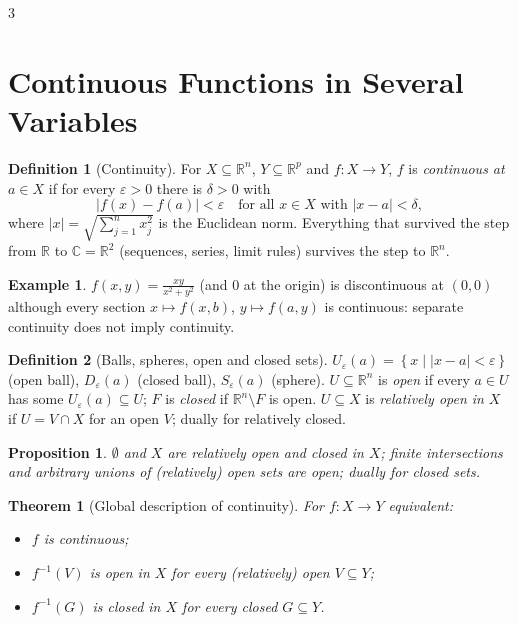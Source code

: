 \documentclass[10pt,a4paper,landscape]{article}
\theoremstyle{definition}
\newtheorem{defn}{Definition}[section]
\newtheorem{exm}{Example}[section]
\theoremstyle{plain}
\newtheorem{thm}{Theorem}[section]
\newtheorem{prop}{Proposition}[section]
\theoremstyle{remark}
\newcommand{\R}{\mathbb{R}}
\newcommand{\C}{\mathbb{C}}
\newcommand{\eps}{\varepsilon}
\newcommand{\abs}[1]{\lvert #1 \rvert}
\newcommand{\set}[1]{\left\{ #1 \right\}}
\begin{document}
\begin{multicols*}{3}

\section{Continuous Functions in Several Variables}

\begin{defn}[Continuity]
For $X \subseteq \R^n$, $Y \subseteq \R^p$ and $f: X \to Y$, $f$ is \emph{continuous at} $a \in X$ if for every $\eps > 0$ there is $\delta > 0$ with
\[
\abs{f(x) - f(a)} < \eps \quad \text{for all } x \in X \text{ with } \abs{x - a} < \delta,
\]
where $\abs{x} = \sqrt{\sum_{j=1}^n x_j^2}$ is the Euclidean norm. Everything that survived the step from $\R$ to $\C = \R^2$ (sequences, series, limit rules) survives the step to $\R^n$.
\end{defn}

\begin{exm}
$f(x,y) = \frac{xy}{x^2+y^2}$ (and $0$ at the origin) is discontinuous at $(0,0)$ although every section $x \mapsto f(x,b)$, $y \mapsto f(a,y)$ is continuous: separate continuity does not imply continuity.
\end{exm}

\begin{defn}[Balls, spheres, open and closed sets]
$U_\eps(a) = \set{x \mid \abs{x-a} < \eps}$ (open ball), $D_\eps(a)$ (closed ball), $S_\eps(a)$ (sphere). $U \subseteq \R^n$ is \emph{open} if every $a \in U$ has some $U_\eps(a) \subseteq U$; $F$ is \emph{closed} if $\R^n \setminus F$ is open. $U \subseteq X$ is \emph{relatively open in} $X$ if $U = V \cap X$ for an open $V$; dually for relatively closed.
\end{defn}

\begin{prop}
$\emptyset$ and $X$ are relatively open and closed in $X$; finite intersections and arbitrary unions of (relatively) open sets are open; dually for closed sets.
\end{prop}

\begin{thm}[Global description of continuity]
For $f: X \to Y$ equivalent:
\begin{itemize}
\item $f$ is continuous;
\item $f^{-1}(V)$ is open in $X$ for every (relatively) open $V \subseteq Y$;
\item $f^{-1}(G)$ is closed in $X$ for every closed $G \subseteq Y$.
\end{itemize}
\end{thm}


\end{multicols*}
\end{document}
